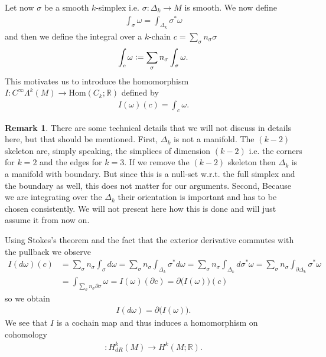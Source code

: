 \documentclass[12pt,a4paper]{article}
\numberwithin{equation}{subsection}
\numberwithin{lemma}{subsection}
\theoremstyle{definition}
\newtheorem{remark}[lemma]{Remark}
\newcommand{\real}{\mathbb{R}}
\begin{document}
Let now $\sigma$ be a smooth $k$-simplex i.e. $\sigma: \Delta_k \rightarrow 
M$ is smooth. We now define 
\begin{align*}
    \int_\sigma \omega = \int_{\Delta_k} \sigma^* \omega
\end{align*}
and then we define the integral over a $k$-chain 
$c = \sum_\sigma n_\sigma \sigma$
\begin{align*}
    \int_c \omega \vcentcolon= \sum \limits_\sigma n_\sigma \int_\sigma \omega.
\end{align*}
This motivates us to introduce the homomorphism $I: C^\infty \Lambda^k (M) 
\rightarrow \text{Hom}(C_k;\real)$ defined by 
\begin{align*}
    I(\omega)(c) = \int_c \omega.
\end{align*}
\begin{remark}
    There are some technical details that we will not discuss in details here,
    but that should be mentioned. First, $\Delta_k$ is not a manifold. 
    The $(k-2)$ skeleton are, simply speaking, 
    the simplices of dimension $(k-2)$ i.e. the corners for $k=2$ and the 
    edges for $k=3$. If we remove the $(k-2)$ skeleton 
    then $\Delta_k$ is a manifold 
    with boundary. But since this is a null-set w.r.t. the full simplex and 
    the boundary as well, this does not matter for our arguments. 
    Second, Because we are integrating over the $\Delta_k$ their orientation is 
    important and has to be chosen consistently. We will not present here 
    how this is done and will just assume it from now on.
\end{remark}

Using Stokes's theorem and the fact that the exterior derivative commutes with 
the pullback we observe
\begin{align*}
    I(d\omega)(c) &= \sum\limits_\sigma n_\sigma \int_\sigma d\omega 
    = \sum\limits_\sigma n_\sigma \int_{\Delta_k} \sigma^* d\omega 
    = \sum\limits_\sigma n_\sigma \int_{\Delta_k} d\sigma^* \omega
    = \sum\limits_\sigma n_\sigma \int_{\partial \Delta_k} \sigma^* \omega
    \\ &= \int_{\sum_\sigma n_\sigma \partial \sigma} \omega
    = I(\omega)(\partial c) = \partial \big(I(\omega)\big) (c)
\end{align*}
so we obtain
\begin{align*}
    I(d\omega) = \partial \big(I(\omega)\big).
\end{align*}
We see that $I$ is a cochain map and thus 
induces a homomorphism on cohomology
\begin{align*}
    [I]:H^k_{dR}(M) \rightarrow H^k(M;\real).
\end{align*}
\end{document}
